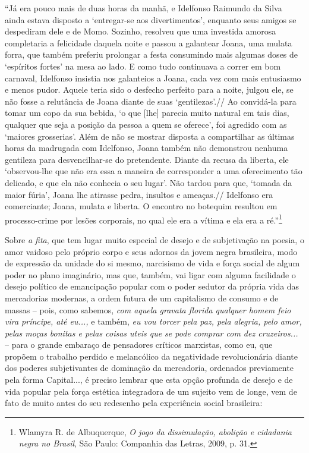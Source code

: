``Já era pouco mais de duas horas da manhã, e Idelfonso Raimundo da
Silva ainda estava disposto a `entregar-se aos divertimentos', enquanto
seus amigos se despediram dele e de Momo. Sozinho, resolveu que uma
investida amorosa completaria a felicidade daquela noite e passou a
galantear Joana, uma mulata forra, que também preferiu prolongar a festa
consumindo mais algumas doses de `espíritos fortes' na mesa ao lado. E
como tudo continuava a correr em bom carnaval, Idelfonso insistia nos
galanteios a Joana, cada vez com mais entusiasmo e menos pudor. Aquele
teria sido o desfecho perfeito para a noite, julgou ele, se não fosse a
relutância de Joana diante de suas `gentilezas'.// Ao convidá-la para
tomar um copo da sua bebida, `o que {[}lhe{]} parecia muito natural em
tais dias, qualquer que seja a posição da pessoa a quem se oferece', foi
agredido com as `maiores grosserias'. Além de não se mostrar disposta a
compartilhar as últimas horas da madrugada com Idelfonso, Joana também
não demonstrou nenhuma gentileza para desvencilhar-se do pretendente.
Diante da recusa da liberta, ele `observou-lhe que não era essa a
maneira de corresponder a uma oferecimento tão delicado, e que ela não
conhecia o seu lugar'. Não tardou para que, `tomada da maior fúria',
Joana lhe atirasse pedra, insultos e ameaças.// Idelfonso era
comerciante; Joana, mulata e liberta. O encontro no botequim resultou em
processo-crime por lesões corporais, no qual ele era a vítima e ela era
a ré.''\footnote{Wlamyra R. de Albuquerque, \emph{O jogo da
  dissimulação, abolição e cidadania negra no Brasil}, São Paulo:
  Companhia das Letras, 2009, p. 31.}

Sobre \emph{a fita}, que tem lugar muito especial de desejo e de
subjetivação na poesia, o amor vaidoso pelo próprio corpo e seus adornos
da jovem negra brasileira, modo de expressão da unidade do si mesmo,
narcisismo de vida e força social de algum poder no plano imaginário,
mas que, também, vai ligar com alguma facilidade o desejo político de
emancipação popular com o poder sedutor da própria vida das mercadorias
modernas, a ordem futura de um capitalismo de consumo e de massas --
pois, como sabemos, \emph{com aquela gravata florida qualquer homem feio
vira príncipe, até eu...,} e também, \emph{eu vou torcer pela paz, pela
alegria, pelo amor, pelas moças bonitas e pelas coisas uteis que se pode
comprar com dez cruzeiros...} -- para o grande embaraço de pensadores
críticos marxistas, como eu, que propõem o trabalho perdido e
melancólico da negatividade revolucionária diante dos poderes
subjetivantes de dominação da mercadoria, ordenados previamente pela
forma Capital..., é preciso lembrar que esta opção profunda de desejo e
de vida popular pela força estética integradora de um sujeito vem de
longe, vem de fato de muito antes do seu redesenho pela experiência
social brasileira:

